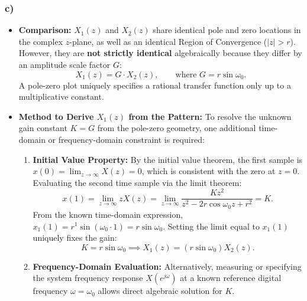 \documentclass[12pt,a4paper]{article}
\begin{document}
\subsubsection*{c)}
\begin{itemize}
    \item \textbf{Comparison:} $X_1(z)$ and $X_2(z)$ share identical pole and zero locations in the complex $z$-plane, as well as an identical Region of Convergence ($|z| > r$). However, they are \textbf{not strictly identical} algebraically because they differ by an amplitude scale factor $G$:
    \begin{equation}
        X_1(z) = G \cdot X_2(z), \qquad \text{where } G = r \sin\omega_0.
    \end{equation}
    A pole-zero plot uniquely specifies a rational transfer function only up to a multiplicative constant.
    \item \textbf{Method to Derive $X_1(z)$ from the Pattern:} To resolve the unknown gain constant $K = G$ from the pole-zero geometry, one additional time-domain or frequency-domain constraint is required:
    \begin{enumerate}
        \item \textbf{Initial Value Property:} By the initial value theorem, the first sample is $x(0) = \lim_{z \to \infty} X(z) = 0$, which is consistent with the zero at $z=0$. Evaluating the second time sample via the limit theorem:
        \begin{equation}
            x(1) = \lim_{z \to \infty} z X(z) = \lim_{z \to \infty} \frac{K z^2}{z^2 - 2r\cos\omega_0 z + r^2} = K.
        \end{equation}
        From the known time-domain expression, $x_1(1) = r^1 \sin(\omega_0 \cdot 1) = r \sin\omega_0$. Setting the limit equal to $x_1(1)$ uniquely fixes the gain:
        \begin{equation}
            K = r \sin\omega_0 \implies X_1(z) = (r \sin\omega_0) X_2(z).
        \end{equation}
        \item \textbf{Frequency-Domain Evaluation:} Alternatively, measuring or specifying the system frequency response $X(e^{j\omega})$ at a known reference digital frequency $\omega = \omega_0$ allows direct algebraic solution for $K$.
    \end{enumerate}
\end{itemize}

\newpage
\end{document}
